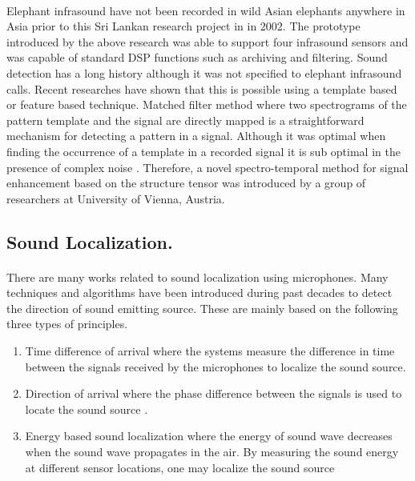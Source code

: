 \documentclass[12pt]{article}
\numberwithin{figure}{section}
\numberwithin{table}{section}
\begin{document}
\paragraph{}
Elephant infrasound have not been recorded in wild Asian elephants anywhere in Asia prior to this Sri Lankan research project in in 2002. The prototype introduced by the above research was able to support four infrasound sensors and was capable of standard DSP functions such as archiving and filtering. Sound detection has a long history although it was not specified to elephant infrasound calls. Recent researches have shown that this is possible using a template based or feature based technique. Matched filter method where two spectrograms of the pattern template and the signal are directly mapped is a straightforward mechanism for detecting a pattern in a signal. Although it was optimal when finding the occurrence of a template in a recorded signal it is sub optimal in the presence of complex noise \cite {10}. Therefore, a novel spectro-temporal method for signal enhancement based on the structure tensor \cite {11} was introduced by a group of researchers at University of Vienna, Austria. 

\subsection{Sound Localization.}
\paragraph{}
There are many works related to sound localization using microphones. Many techniques and algorithms have been introduced during past decades to detect the direction of sound emitting source. These are mainly based on the following three types of principles.
\begin{enumerate}
\item Time difference of arrival where the systems measure the difference in time between the signals received by the microphones to localize the sound source.
\item Direction of arrival where the phase difference between the signals is used to locate the sound source \cite {20}.
\item Energy based sound localization where the energy of sound wave decreases when the sound wave propagates in the air. By measuring the sound energy at different sensor locations, one may localize the sound source \cite {21}
\end{enumerate}
\end{document}
